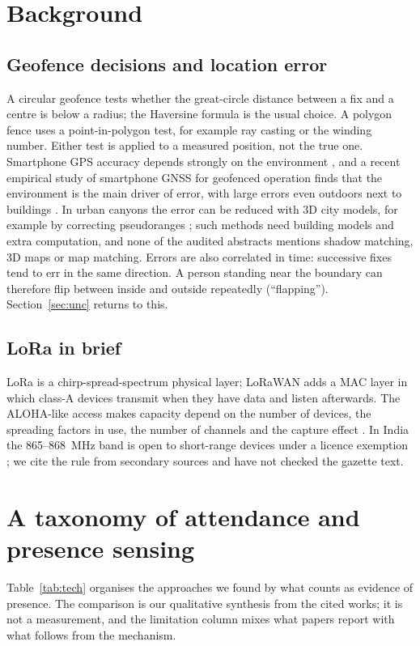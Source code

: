 \documentclass[preprint,12pt]{elsarticle}
\begin{document}
\section{Background}
\subsection{Geofence decisions and location error}
A circular geofence tests whether the great-circle distance between a fix and a centre is below a radius; the Haversine formula \cite{sinnott1984haversine} is the usual choice. A polygon fence uses a point-in-polygon test, for example ray casting or the winding number. Either test is applied to a measured position, not the true one. Smartphone GPS accuracy depends strongly on the environment \cite{zandbergen2009iphone,merry2019smartphone,schipperijn2014dynamic}, and a recent empirical study of smartphone GNSS for geofenced operation finds that the environment is the main driver of error, with large errors even outdoors next to buildings \cite{palathinkal2026evaluating}. In urban canyons the error can be reduced with 3D city models, for example by correcting pseudoranges \cite{miura2015error}; such methods need building models and extra computation, and none of the \nAudit{} audited abstracts mentions shadow matching, 3D maps or map matching. Errors are also correlated in time: successive fixes tend to err in the same direction. A person standing near the boundary can therefore flip between inside and outside repeatedly (``flapping''). Section~\ref{sec:unc} returns to this.

\subsection{LoRa in brief}
LoRa is a chirp-spread-spectrum physical layer; LoRaWAN adds a MAC layer in which class-A devices transmit when they have data and listen afterwards. The ALOHA-like access makes capacity depend on the number of devices, the spreading factors in use, the number of channels and the capture effect \cite{augustin2016lora,haxhibeqiri2018survey,jouhari2023survey}. In India the 865--868~MHz band is open to short-range devices under a licence exemption \cite{dot865}; we cite the rule from secondary sources and have not checked the gazette text.

\section{A taxonomy of attendance and presence sensing}\label{sec:tax}
Table~\ref{tab:tech} organises the approaches we found by what counts as evidence of presence. The comparison is our qualitative synthesis from the cited works; it is not a measurement, and the limitation column mixes what papers report with what follows from the mechanism.
\end{document}
